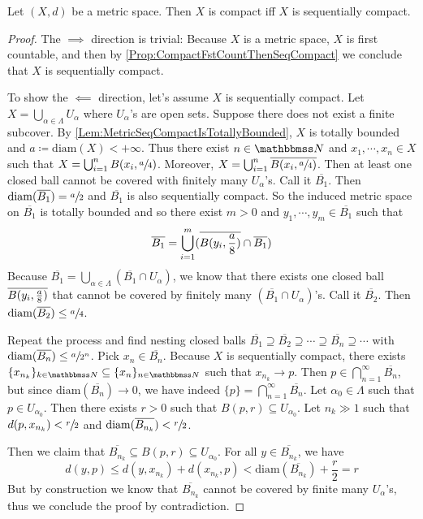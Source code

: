 \documentclass[screen,single]{techreport}
\numberwithin{equation}{section}
\begin{document}
\begin{proposition}\label{Prop:MetricCompactIffSeqCompact}
	Let $(X,d)$ be a metric space.
	Then $X$ is compact iff $X$ is sequentially compact.
\end{proposition}
\begin{proof}
	The ${\implies}$ direction is trivial: Because $X$ is a metric space, $X$ is first countable, and then by \cref{Prop:CompactFstCountThenSeqCompact} we conclude that $X$ is sequentially compact.
	
	To show the ${\impliedby}$ direction, let's assume $X$ is sequentially compact.
	Let $X = \bigcup_{\alpha \in \Lambda} U_\alpha$ where $U_\alpha$'s are open sets.
	Suppose there does not exist a finite subcover.
	By \cref{Lem:MetricSeqCompactIsTotallyBounded}, $X$ is totally bounded and $a	\coloneqq \mathrm{diam}(X) < +\infty$.
	Thus there exist $n \in \bbN$ and $x_1,\cdots,x_n \in X$ such that $X = \bigcup_{i=1}^n B(x_i, \sfrac{a}{4})$.
	Moreover, $X = \bigcup_{i=1}^n \overline{B(x_i, \sfrac{a}{4})}$.
	Then at least one closed ball cannot be covered with finitely many $U_\alpha$'s.
	Call it $\overline{B_1}$. Then $\mathrm{diam}(\overline{B_1}) = \sfrac{a}{2}$ and $\overline{B_1}$ is also sequentially compact.
	So the induced metric space on $\overline{B_1}$ is totally bounded and so there exist $m > 0$ and $y_1,\cdots,y_m \in \overline{B_1}$ such that
	\[
	\overline{B_1} = \bigcup_{i=1}^m({ \overline{B({y_i,\frac{a}{8}})} \cap \overline{B_1} })
	\]
	Because $\overline{B_1}=\bigcup_{\alpha \in \Lambda} (\overline{B_1} \cap U_\alpha)$, we know that there exists one closed ball $\overline{B({y_i,\frac{a}{8}})}$ that cannot be covered by finitely many $(\overline{B_1} \cap U_\alpha)$'s.
	Call it $\overline{B_2}$. Then $\mathrm{diam}(\overline{B_2}) \le \sfrac{a}{4}$.
	
	Repeat the process and find nesting closed balls $\overline{B_1} \supseteq \overline{B_2} \supseteq \cdots \supseteq \overline{B_n} \supseteq \cdots$ with $\mathrm{diam}(\overline{B_n}) \le \sfrac{a}{2^n}$.
	Pick $x_n \in \overline{B_n}$.
	Because $X$ is sequentially compact, there exists $\{x_{n_k}\}_{k \in \bbN} \subseteq \{x_n\}_{n \in \bbN}$ such that $x_{n_k} \rightarrow p$.
	Then $p \in \bigcap_{n=1}^\infty \overline{B_n}$, but since $\mathrm{diam}(\overline{B_n}) \rightarrow 0$, we have indeed $\{p\} = \bigcap_{n=1}^\infty \overline{B_n}$.
	Let $\alpha_0 \in \Lambda$ such that $p \in U_{\alpha_0}$.
	Then there exists $r > 0$ such that $B(p,r) \subseteq U_{\alpha_0}$.
	Let $n_k \gg 1$ such that $d(p,x_{n_k}) < \sfrac{r}{2}$ and $\mathrm{diam}(\overline{B_{n_k}}) < \sfrac{r}{2}$.
	
	Then we claim that $\overline{B_{n_k}} \subseteq B(p,r) \subseteq U_{\alpha_0}$.
	For all $y \in \overline{B_{n_k}}$, we have
	\[
	d(y,p) \le d(y,x_{n_k}) + d(x_{n_k}, p) < \mathrm{diam}(\overline{B_{n_k}}) + \frac{r}{2} = r
	\]
	But by construction we know that $\overline{B_{n_k}}$ cannot be covered by finite many $U_\alpha$'s, thus we conclude the proof by contradiction.
\end{proof}
\end{document}
